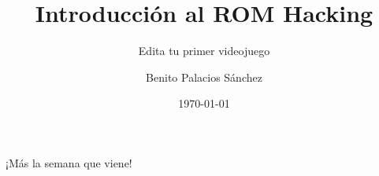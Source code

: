 \documentclass[usenames,dvipsnames]{beamer}
\title{Introducción al ROM Hacking}
\subtitle{Edita tu primer videojuego}
\date[Febrero de 2016]{\today}
\author{Benito Palacios Sánchez}
\institute[IEEE SB UGR]{Rama estudiantil de IEEE en la UGR}
\begin{document}
    \begin{frame}[plain]
        \titlepage{}
    \end{frame}

    
    
    

    \section{}
    \begin{frame}
        \begin{center}
            \huge ¡Más la semana que viene!
        \end{center}
    \end{frame}
\end{document}
